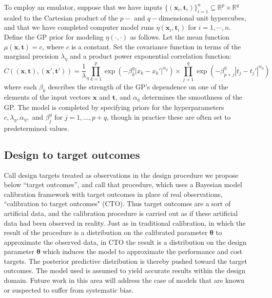 \documentclass[12pt]{article}
\begin{document}
%
To employ an emulator, suppose that we have inputs $\{(\mathbf x_i,\mathbf t_i)\}_{i=1}^n\subseteq \mathbb R^p\times \mathbb R^q$ scaled to the Cartesian product of the $p-$ and $q-$dimensional unit hypercubes, and that we have completed computer model runs 
%
$\eta\left(\mathbf x_i,\mathbf t_i\right)$ for $i=1,\cdots,n.$
%
Define the GP prior for modeling $\eta(\cdot,\cdot)$ as follows. 
%
Let the mean function $\mu(\mathbf x,\mathbf t)=c$, where $c$ is a constant. 
%
Set the covariance function in terms of the marginal precision $\lambda_\eta$ and a product power exponential correlation function:
%
\begin{equation}\label{eq:Hig_cov}
C((\mathbf x,\mathbf t),(\mathbf x',\mathbf t')) = \frac 1\lambda_\eta \prod_{k=1}^{p}
\exp \left(-\beta^\eta_k|x_k-x_k'|^{\alpha_\eta}\right) \times
\prod_{j=1}^{q}
\exp \left(-\beta^\eta_{p+j}|t_j-t_j'|^{\alpha_\eta}\right)
\end{equation}
%
where each $\beta_k$ describes the strength of the GP's dependence on one of the elements of the input vectors $\mathbf x$ and $\mathbf t$, and $\alpha_\eta$ determines the smoothness of the GP. 
%
The model is completed by specifying priors for the hyperparameters $c,\lambda_\eta,\alpha_\eta,$ and $\beta^\eta_j$ for $j=1,\ldots,p+q$, though in practice these are often set to predetermined values.
%

%
\subsection{Design to target outcomes}
%

%
Call design targets treated as observations in the design procedure we propose below ``target outcomes'', and call that procedure, which uses a Bayesian model calibration framework with target outcomes in place of real observations, ``calibration to target outcomes" (CTO). 
%
Thus target outcomes are a sort of artificial data, and the calibration procedure is carried out as if these artificial data had been observed in reality.
%
Just as in traditional calibration, in which the result of the procedure is a distribution on the calibrated parameter $\boldsymbol\theta$ to approximate the observed data, in CTO the result is a distribution on the design parameter $\boldsymbol\theta$ which induces the model to approximate the performance and cost targets.
%
The posterior predictive distribution is thereby pushed toward the target outcomes.
%
%
The model used is assumed to yield accurate results within the design domain.
%
Future work in this area will address the case of models that are known or suspected to suffer from systematic bias.
%
\end{document}
